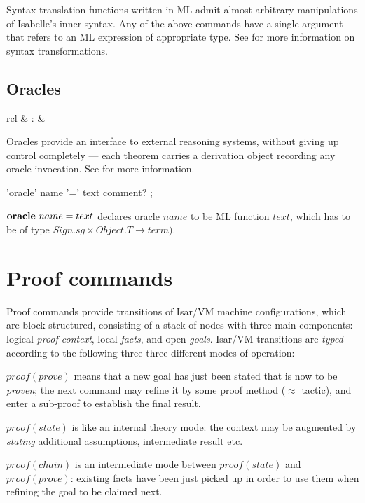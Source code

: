 Syntax translation functions written in ML admit almost arbitrary
manipulations of Isabelle's inner syntax.  Any of the above commands have a
single  argument that refers to an ML expression of
appropriate type.  See \cite[\S8]{isabelle-ref} for more information on syntax
transformations.


\subsection{Oracles}

\begin{matharray}{rcl}
   & : &  \\
\end{matharray}

Oracles provide an interface to external reasoning systems, without giving up
control completely --- each theorem carries a derivation object recording any
oracle invocation.  See \cite[\S6]{isabelle-ref} for more information.

\begin{rail}
  'oracle' name '=' text comment?
  ;
\end{rail}

\begin{descr}
\item [${\mathord{\mathbf{oracle}}}~name=text$] declares oracle $name$ to be ML
  function $text$, which has to be of type $Sign\mathord.sg \times
  Object\mathord.T \to term)$.
\end{descr}


\section{Proof commands}

Proof commands provide transitions of Isar/VM machine configurations, which
are block-structured, consisting of a stack of nodes with three main
components: logical \emph{proof context}, local \emph{facts}, and open
\emph{goals}.  Isar/VM transitions are \emph{typed} according to the following
three three different modes of operation:
\begin{descr}
\item [$proof(prove)$] means that a new goal has just been stated that is now
  to be \emph{proven}; the next command may refine it by some proof method
  ($\approx$ tactic), and enter a sub-proof to establish the final result.
\item [$proof(state)$] is like an internal theory mode: the context may be
  augmented by \emph{stating} additional assumptions, intermediate result etc.
\item [$proof(chain)$] is an intermediate mode between $proof(state)$ and
  $proof(prove)$: existing facts have been just picked up in order to use them
  when refining the goal to be claimed next.
\end{descr}


